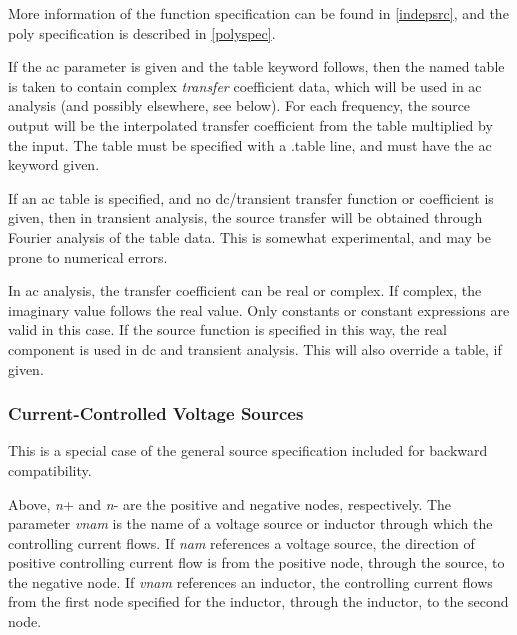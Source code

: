 More information of the function specification can be found in
\ref{indepsrc}, and the {\vt poly} specification is described in
\ref{polyspec}.

If the {\vt ac} parameter is given and the {\vt table} keyword
follows, then the named table is taken to contain complex {\it
transfer} coefficient data, which will be used in ac analysis (and
possibly elsewhere, see below).  For each frequency, the source output
will be the interpolated transfer coefficient from the table
multiplied by the input.  The table must be specified with a {\vt
.table} line, and must have the {\vt ac} keyword given.

If an ac table is specified, and no dc/transient transfer function or
coefficient is given, then in transient analysis, the source transfer
will be obtained through Fourier analysis of the table data.  This is
somewhat experimental, and may be prone to numerical errors.

In ac analysis, the transfer coefficient can be real or complex.  If
complex, the imaginary value follows the real value.  Only constants
or constant expressions are valid in this case.  If the source
function is specified in this way, the real component is used in dc
and transient analysis.  This will also override a table, if given.

\subsubsection{Current-Controlled Voltage Sources}


This is a special case of the general source specification included
for backward compatibility.


Above, {\it n\/}{\vt +} and {\it n\/}{\vt -} are the positive and
negative nodes, respectively.  The parameter {\it vnam} is the name
of a voltage source or inductor through which the controlling current
flows.  If {\it nam} references a voltage source, the direction of
positive controlling current flow is from the positive node, through
the source, to the negative node.  If {\it vnam\/} references an
inductor, the controlling current flows from the first node specified
for the inductor, through the inductor, to the second node.

